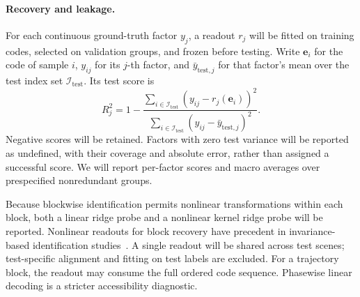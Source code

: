 \paragraph{Recovery and leakage.}
For each continuous ground-truth factor $y_j$, a readout $r_j$ will be
fitted on training codes, selected on validation groups, and frozen
before testing. Write $\mathbf e_i$ for the code of sample $i$, $y_{ij}$ for its
$j$-th factor, and $\bar y_{\mathrm{test},j}$ for that factor's mean over
the test index set $\mathcal I_{\mathrm{test}}$. Its test score is
\begin{equation}
  R_j^2
  =1-\frac{\sum_{i\in\mathcal I_{\mathrm{test}}}
                (y_{ij}-r_j(\mathbf e_i))^2}
              {\sum_{i\in\mathcal I_{\mathrm{test}}}
                (y_{ij}-\bar y_{\mathrm{test},j})^2}.
  \label{eq:recovery-r2}
\end{equation}
Negative scores will be retained. Factors with zero test variance will
be reported as undefined, with their coverage and absolute error,
rather than assigned a successful score. We will report per-factor
scores and macro averages over prespecified nonredundant groups.

Because blockwise identification permits nonlinear transformations within each
block, both a linear ridge probe and a nonlinear kernel ridge probe
will be reported. Nonlinear readouts for block recovery have precedent
in invariance-based identification studies~\citep{kugelgen2021content}.
A single readout will be shared across test scenes; test-specific
alignment and fitting on test labels are excluded. For a trajectory
block, the readout may consume the full ordered code sequence.
Phasewise linear decoding is a stricter accessibility diagnostic.

